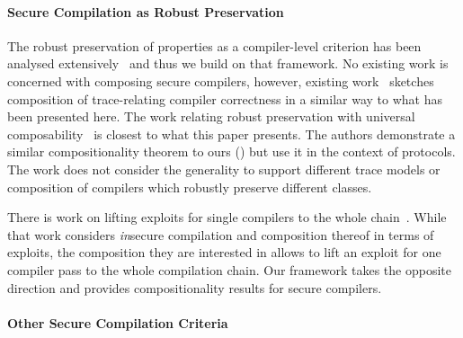 \documentclass[acmsmall]{acmart}
\theoremstyle{definition}
\begin{document}
\paragraph*{Secure Compilation as Robust Preservation}\label{subsec:relw:seccomprtp}

The robust preservation of properties as a compiler-level criterion has been analysed extensively~\cite{abate2019jour,patrignani2021rsc,abate2021extacc,patrignani2019survey} and thus we build on that framework.
No existing work is concerned with composing secure compilers, however, existing work~\cite{abate2021extacc} sketches composition of trace-relating compiler correctness in a similar way to what has been presented here.
The work relating robust preservation with universal composability~\cite{patrignani2022universal} is closest to what this paper presents.
% 
The authors demonstrate a similar compositionality theorem to ours () but use it in the context of protocols.
% 
The work does not consider the generality to support different trace models or composition of compilers which robustly preserve different classes.


There is work on lifting exploits for single compilers to the whole chain~\cite{paykin2019weird}.
While that work considers {\em in}secure compilation and composition thereof in terms of exploits, the composition they are interested in allows to lift an exploit for one compiler pass to the whole compilation chain. 
Our framework takes the opposite direction and provides compositionality results for secure compilers.
%
%

\paragraph*{Other Secure Compilation Criteria}\label{subsec:relw:seccompcrit}
\end{document}
